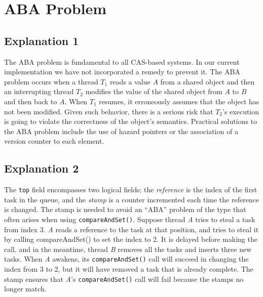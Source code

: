 


\section{ABA Problem}

\subsection{Explanation 1}

The ABA problem is fundamental to all CAS-based systems. In our
current implementation we have not incorporated a remedy to prevent
it. The ABA problem occurs when a thread $T_1$ reads a value $A$ from
a shared object and then an interrupting thread $T_2$ modifies the
value of the shared object from $A$ to $B$ and then back to $A$. When
$T_1$ resumes, it erroneously assumes that the object has not been
modified. Given such behavior, there is a serious risk that $T_2$'s
execution is going to violate the correctness of the object's
semantics. Practical solutions to the ABA problem include the use of
hazard pointers \cite{Michael2004} or the association of a version
counter to each element.

\subsection{Explanation 2}

The \lstinline!top! field encompasses two logical fields; the
\emph{reference} is the index of the first task in the queue, and the
\emph{stamp} is a counter incremented each time the reference is
changed. The stamp is needed to avoid an ``ABA'' problem of the type
that often arises when using \lstinline!compareAndSet()!. Suppose
thread \emph{A} tries to steal a task from index 3.  \emph{A} reads a
reference to the task at that position, and tries to steal it by
calling compareAndSet() to set the index to 2. It is delayed before
making the call, and in the meantime, thread \emph{B} removes all the
tasks and inserts three new tasks. When \emph{A} awakens, its
\lstinline!compareAndSet()!  call will succeed in changing the index
from 3 to 2, but it will have removed a task that is already
complete. The stamp ensures that \emph{A}'s
\lstinline!compareAndSet()! call will fail because the stamps no
longer match.


